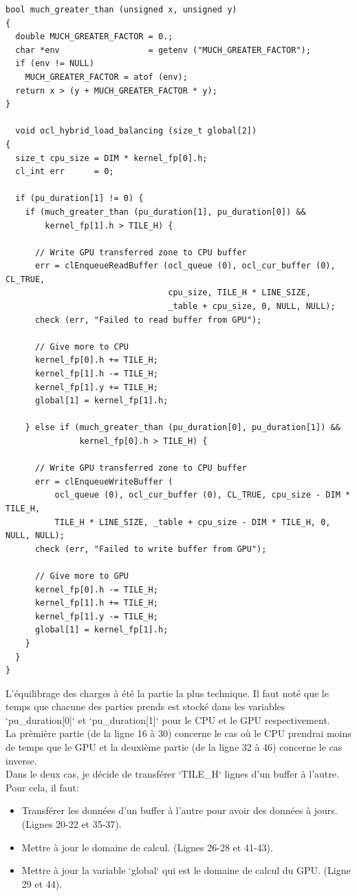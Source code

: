 \documentclass[a4paper,12pt]{article}
\begin{document}
\begin{lstlisting}[style=cstyle, caption=Equilibrage des charges]
bool much_greater_than (unsigned x, unsigned y)
{
  double MUCH_GREATER_FACTOR = 0.;
  char *env                  = getenv ("MUCH_GREATER_FACTOR");
  if (env != NULL)
    MUCH_GREATER_FACTOR = atof (env);
  return x > (y + MUCH_GREATER_FACTOR * y);
}

  void ocl_hybrid_load_balancing (size_t global[2])
{
  size_t cpu_size = DIM * kernel_fp[0].h;
  cl_int err      = 0;

  if (pu_duration[1] != 0) {
    if (much_greater_than (pu_duration[1], pu_duration[0]) &&
        kernel_fp[1].h > TILE_H) {

      // Write GPU transferred zone to CPU buffer
      err = clEnqueueReadBuffer (ocl_queue (0), ocl_cur_buffer (0), CL_TRUE,
                                 cpu_size, TILE_H * LINE_SIZE,
                                 _table + cpu_size, 0, NULL, NULL);
      check (err, "Failed to read buffer from GPU");

      // Give more to CPU
      kernel_fp[0].h += TILE_H;
      kernel_fp[1].h -= TILE_H;
      kernel_fp[1].y += TILE_H;
      global[1] = kernel_fp[1].h;

    } else if (much_greater_than (pu_duration[0], pu_duration[1]) &&
               kernel_fp[0].h > TILE_H) {

      // Write GPU transferred zone to CPU buffer
      err = clEnqueueWriteBuffer (
          ocl_queue (0), ocl_cur_buffer (0), CL_TRUE, cpu_size - DIM * TILE_H,
          TILE_H * LINE_SIZE, _table + cpu_size - DIM * TILE_H, 0, NULL, NULL);
      check (err, "Failed to write buffer from GPU");

      // Give more to GPU
      kernel_fp[0].h -= TILE_H;
      kernel_fp[1].h += TILE_H;
      kernel_fp[1].y -= TILE_H;
      global[1] = kernel_fp[1].h;
    }
  }
}
\end{lstlisting}

L'équilibrage des charges à été la partie la plus technique.
Il faut noté que le temps que chacune des parties prends est stocké dans les variables `pu\_duration[0]` et `pu\_duration[1]` pour le CPU et le GPU respectivement.\\

La prèmière partie (de la ligne 16 à 30) concerne le cas où le CPU prendrai moins de temps que le GPU et la deuxième partie (de la ligne 32 à 46) concerne le cas inverse.\\
Dans le deux cas, je décide de transférer `TILE\_H` lignes  d'un buffer à l'autre. Pour cela, il faut:
\begin{itemize}
  \item Transférer les données d'un buffer à l'autre pour avoir des données à jours. (Lignes 20-22 et 35-37).
  \item Mettre à jour le domaine de calcul. (Lignes 26-28 et 41-43).
  \item Mettre à jour la variable `global` qui est le domaine de calcul du GPU. (Ligne 29 et 44).
\end{itemize}
\end{document}

